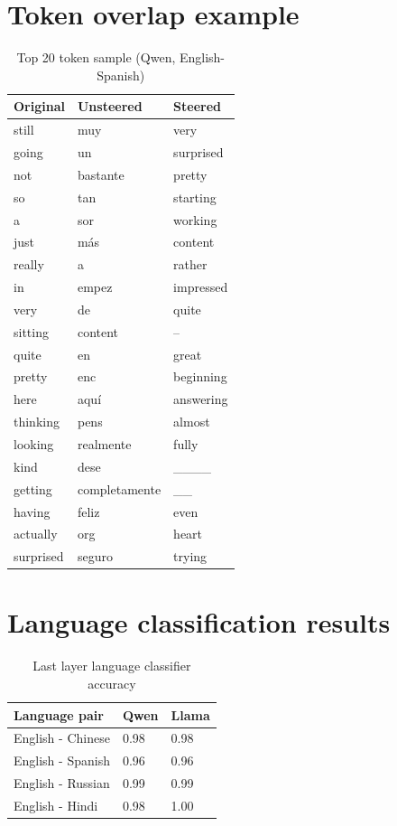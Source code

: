 \section{Token overlap example}

\begin{table}[h]
  \small
  \centering
  \begin{tabular}{l l l}
    \hline
    Original & Unsteered & Steered \\
    \hline
    still & muy & very \\
    going & un  & surprised \\
    not & bastante & pretty \\
    so & tan & starting \\
    a & sor & working \\
    just & más & content \\
    really & a & rather \\
    in & empez & impressed \\
    very & de & quite \\
    sitting & content & -- \\
    quite & en & great \\
    pretty & enc & beginning \\
    here & aquí & answering \\
    thinking & pens & almost\\
    looking & realmente & fully \\
    kind & dese & \_\_\_\_ \\
    getting & completamente & \_\_ \\
    having & feliz & even \\
    actually & org & heart \\
    surprised & seguro & trying \\
    \hline
  \end{tabular}
  \caption{Top 20 token sample (Qwen, English-Spanish)}
  \label{tab:token_sample}
\end{table}

\section{Language classification results}

\begin{table}[h]
  \centering
  \begin{tabular}{l l l}
    \hline
    Language pair & Qwen & Llama \\
    \hline
    English - Chinese & 0.98 & 0.98 \\
    English - Spanish & 0.96 & 0.96 \\
    English - Russian & 0.99 & 0.99 \\
    English - Hindi & 0.98 & 1.00 \\
    \hline
  \end{tabular}
  \caption{Last layer language classifier accuracy}
  \label{tab:clf}
\end{table}

